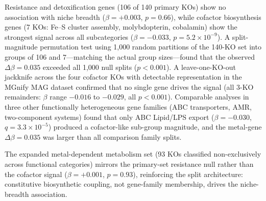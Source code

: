 \documentclass[times]{zHenriquesLab-StyleBioRxiv}
\begin{document}
Resistance and
detoxification genes (106 of 140 primary KOs) show no association with niche
breadth ($\beta = +0.003$, $p = 0.66$), while cofactor biosynthesis genes
(7 KOs: Fe--S cluster assembly, molybdopterin, cobalamin) show the
strongest signal across all subcategories ($\beta = -0.033$,
$p = 5.2 \times 10^{-9}$). A split-magnitude permutation test using 1,000
random partitions of the 140-KO set into groups of 106 and 7---matching the
actual group sizes---found that the observed $\Delta\beta = 0.035$ exceeded all
1,000 null splits ($p < 0.001$). A leave-one-KO-out jackknife across the
four cofactor KOs with detectable representation in the MGnify MAG dataset
confirmed that no single gene drives the signal (all 3-KO remainders: $\beta$
range $-0.016$ to $-0.029$, all $p < 0.001$). Comparable analyses in three
other functionally heterogeneous gene families (ABC transporters, AMR,
two-component systems) found that only ABC Lipid/LPS export ($\beta = -0.030$,
$q = 3.3 \times 10^{-5}$) produced a cofactor-like sub-group magnitude, and
the metal-gene $\Delta\beta = 0.035$ was larger than all comparison family
splits.

The expanded metal-dependent metabolism set (93 KOs classified
non-exclusively across functional categories) mirrors the primary-set resistance
null rather than the cofactor signal ($\beta = +0.001$, $p = 0.93$), reinforcing
the split architecture: constitutive biosynthetic coupling, not gene-family
membership, drives the niche-breadth association.
\end{document}
